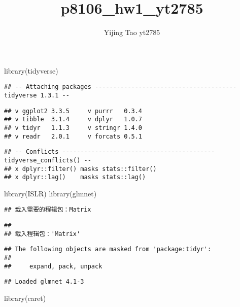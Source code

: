 \documentclass[
]{article}
\title{p8106\_hw1\_yt2785}
\author{Yijing Tao yt2785}
\date{}
\newenvironment{Shaded}{\begin{snugshade}}{\end{snugshade}}
\newcommand{\FunctionTok}[1]{\textcolor[rgb]{0.00,0.00,0.00}{#1}}
\newcommand{\NormalTok}[1]{#1}
\begin{document}
\maketitle

\begin{Shaded}
\begin{Highlighting}[]
\FunctionTok{library}\NormalTok{(tidyverse)}
\end{Highlighting}
\end{Shaded}

\begin{verbatim}
## -- Attaching packages --------------------------------------- tidyverse 1.3.1 --
\end{verbatim}

\begin{verbatim}
## v ggplot2 3.3.5     v purrr   0.3.4
## v tibble  3.1.4     v dplyr   1.0.7
## v tidyr   1.1.3     v stringr 1.4.0
## v readr   2.0.1     v forcats 0.5.1
\end{verbatim}

\begin{verbatim}
## -- Conflicts ------------------------------------------ tidyverse_conflicts() --
## x dplyr::filter() masks stats::filter()
## x dplyr::lag()    masks stats::lag()
\end{verbatim}

\begin{Shaded}
\begin{Highlighting}[]
\FunctionTok{library}\NormalTok{(ISLR)}
\FunctionTok{library}\NormalTok{(glmnet)}
\end{Highlighting}
\end{Shaded}

\begin{verbatim}
## 载入需要的程辑包：Matrix
\end{verbatim}

\begin{verbatim}
## 
## 载入程辑包：'Matrix'
\end{verbatim}

\begin{verbatim}
## The following objects are masked from 'package:tidyr':
## 
##     expand, pack, unpack
\end{verbatim}

\begin{verbatim}
## Loaded glmnet 4.1-3
\end{verbatim}

\begin{Shaded}
\begin{Highlighting}[]
\FunctionTok{library}\NormalTok{(caret)}
\end{Highlighting}
\end{Shaded}
\end{document}
